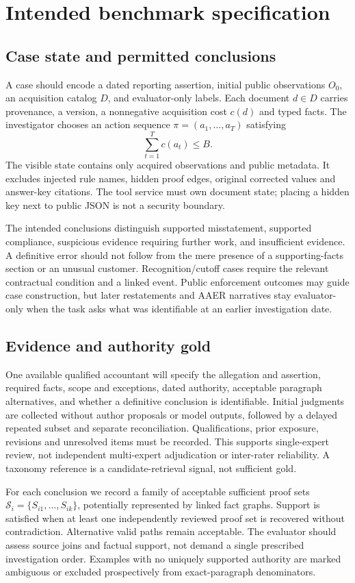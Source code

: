 \documentclass[11pt]{article}
\begin{document}
\section{Intended benchmark specification}
\subsection{Case state and permitted conclusions}
A case should encode a dated reporting assertion, initial public observations $O_0$, an acquisition catalog $D$, and evaluator-only labels. Each document $d\in D$ carries provenance, a version, a nonnegative acquisition cost $c(d)$ and typed facts. The investigator chooses an action sequence $\pi=(a_1,\ldots,a_T)$ satisfying
\[
 \sum_{t=1}^T c(a_t)\leq B.
\]
The visible state contains only acquired observations and public metadata. It excludes injected rule names, hidden proof edges, original corrected values and answer-key citations. The tool service must own document state; placing a hidden key next to public JSON is not a security boundary.

The intended conclusions distinguish supported misstatement, supported compliance, suspicious evidence requiring further work, and insufficient evidence. A definitive error should not follow from the mere presence of a supporting-facts section or an unusual customer. Recognition/cutoff cases require the relevant contractual condition and a linked event. Public enforcement outcomes may guide case construction, but later restatements and AAER narratives stay evaluator-only when the task asks what was identifiable at an earlier investigation date.

\subsection{Evidence and authority gold}
One available qualified accountant will specify the allegation and assertion, required facts, scope and exceptions, dated authority, acceptable paragraph alternatives, and whether a definitive conclusion is identifiable. Initial judgments are collected without author proposals or model outputs, followed by a delayed repeated subset and separate reconciliation. Qualifications, prior exposure, revisions and unresolved items must be recorded. This supports single-expert review, not independent multi-expert adjudication or inter-rater reliability. A taxonomy reference is a candidate-retrieval signal, not sufficient gold.

For each conclusion we record a family of acceptable sufficient proof sets $\mathcal{S}_i=\{S_{i1},\ldots,S_{ik}\}$, potentially represented by linked fact graphs. Support is satisfied when at least one independently reviewed proof set is recovered without contradiction. Alternative valid paths remain acceptable. The evaluator should assess source joins and factual support, not demand a single prescribed investigation order. Examples with no uniquely supported authority are marked ambiguous or excluded prospectively from exact-paragraph denominators.
\end{document}
